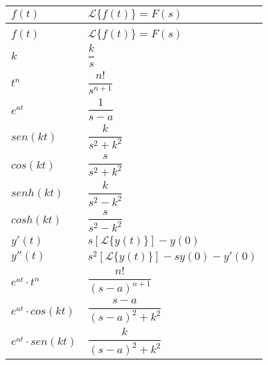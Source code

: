 \documentclass[12pt]{report}                                %
\begin{document}
        \begin{longtable}{p{60mm} || p{70mm}}
            \renewcommand{\arraystretch}{1.5}
            \Huge $f(t)$ & \Huge $\mathscr{L}\{f(t)\} = F(s)$                                                       \\ [1.5ex] 
            \hline\hline                                                                                            \\
            \endfirsthead   
            \Huge $f(t)$ & \Huge $\mathscr{L}\{f(t)\} = F(s)$                                                       \\ [1.5ex]
            \hline\hline                                                                   
            \endhead

            \Large $k$                               &\Large      $\dfrac{k}{s}$                                    \\ [3.0ex]
            \Large $t^n$                             &\Large      $\dfrac{n!}{s^{n+1}}$                             \\ [3.0ex]
            \Large $e^{at}$                          &\Large      $\dfrac{1}{s-a}$                                  \\ [3.0ex]
            \Large $sen(kt)$                         &\Large      $\dfrac{k}{s^2+k^2}$                              \\ [3.0ex]
            \Large $cos(kt)$                         &\Large      $\dfrac{s}{s^2+k^2}$                              \\ [3.0ex]
            \Large $senh(kt)$                        &\Large      $\dfrac{k}{s^2-k^2}$                              \\ [3.0ex]
            \Large $cosh(kt)$                        &\Large      $\dfrac{s}{s^2-k^2}$                              \\ [3.0ex]
            \Large $y'(t)$                           &\Large      $s[\mathscr{L}\{y(t)\}] -y(0)$                    \\ [3.0ex]
            \Large $y''(t)$                          &\Large      $s^2[\mathscr{L}\{y(t)\}] -sy(0) -y'(0)$          \\ [3.0ex]

            \Large $e^{at} \cdot t^n$                &\Large      $\dfrac{n!}{(s-a)^{n+1}}$                         \\ [3.0ex]
            \Large $e^{at} \cdot cos(kt)$            &\Large      $\dfrac{s-a}{(s-a)^2+k^2}$                        \\ [3.0ex]
            \Large $e^{at} \cdot sen(kt)$            &\Large      $\dfrac{k}{(s-a)^2+k^2}$                          \\ [3.0ex]


 
        \end{longtable}
\end{document}
